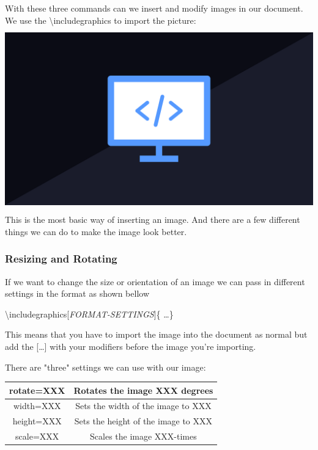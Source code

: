 \documentclass{article}
\newcommand{\jbs}[1]{\textbackslash{}#1} %
\begin{document}
With these three commands can we insert and modify images in our document. We use the \jbs{includegraphics} to import the picture: \\
\includegraphics[height=8cm]{Images/Programming.png} \\
This is the most basic way of inserting an image. And there are a few different things we can do to make 
the image look better.

\subsubsection{Resizing and Rotating}
If we want to change the size or orientation of an image we can pass in different settings in the format as shown bellow

\begin{center}
\jbs{includegraphics[\textit{FORMAT-SETTINGS}]\{ \ldots \} } \\
\end{center}

This means that you have to import the image into the document as normal but add the [\ldots] with your modifiers
before the image you're importing. 

There are "three" settings we can use with our image:
\begin{table}[H]
    \centering
    \begin{tabular}{|c|c|} \hline
        rotate=XXX & Rotates the image XXX degrees \\ \hline
        width=XXX & Sets the width of the image to XXX \\ \hline
        height=XXX & Sets the height of the image to XXX \\ \hline
        \rowcolor{gray!30}
        scale=XXX & Scales the image XXX-times \\ \hline
    \end{tabular}
\end{table} %
\end{document}
